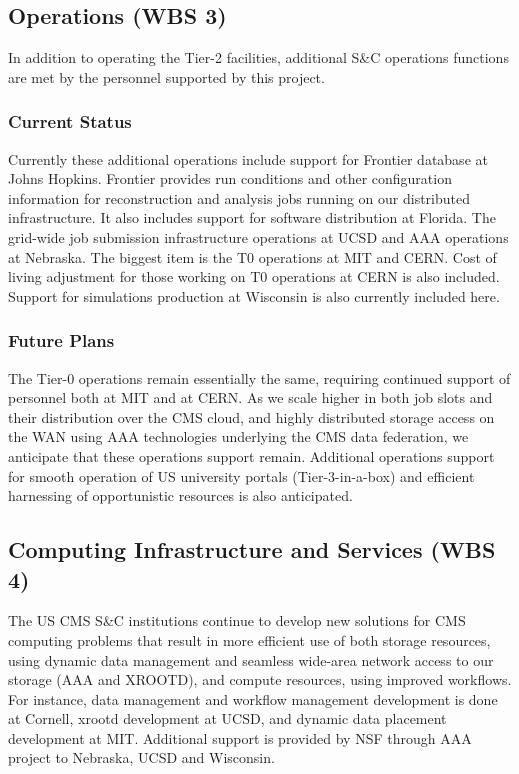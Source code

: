 \documentclass[11pt,a4paper]{article}
\begin{document}
\subsection{Operations (WBS 3)}

In addition to operating the Tier-2 facilities, additional S\&C 
operations functions are met by the personnel supported by this
project.  

\subsubsection{Current Status}

Currently these additional operations include support for Frontier
database at Johns Hopkins.  Frontier provides run conditions and other
configuration information for reconstruction and analysis jobs running
on our distributed infrastructure.  It also includes support for
software distribution at Florida.  The grid-wide job submission
infrastructure operations at UCSD and AAA operations at Nebraska. The
biggest item is the T0 operations at MIT and CERN.  Cost of living
adjustment for those working on T0 operations at CERN is also
included.  Support for simulations production at Wisconsin is also
currently included here.

\subsubsection{Future Plans}

The Tier-0 operations remain essentially the same, requiring continued
support of personnel both at MIT and at CERN.  As we scale higher in
both job slots and their distribution over the CMS cloud, and highly
distributed storage access on the WAN using AAA technologies
underlying the CMS data federation, we anticipate that these
operations support remain.  Additional operations support for smooth
operation of US university portals (Tier-3-in-a-box) and efficient
harnessing of opportunistic resources is also anticipated.

\subsection{Computing Infrastructure and Services (WBS 4)}

The US CMS S\&C institutions continue to develop new solutions for CMS
computing problems that result in more efficient use of both storage
resources, using dynamic data management and seamless wide-area
network access to our storage (AAA and XROOTD), and compute resources,
using improved workflows.  For instance, data management and workflow 
management development is done at Cornell, xrootd development at
UCSD, and dynamic data placement development at MIT.  Additional 
support is provided by NSF through AAA project to Nebraska, UCSD
and Wisconsin.
\end{document}
